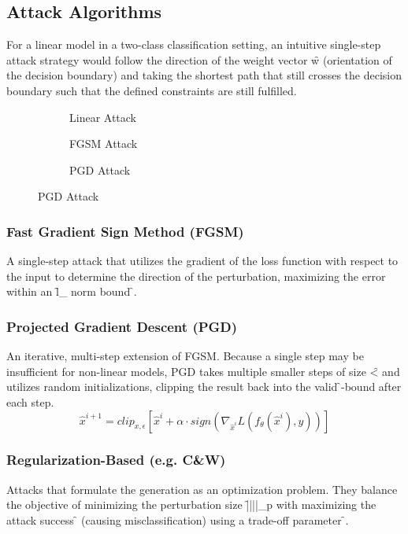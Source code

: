\subsection{Attack Algorithms}
For a linear model in a two-class classification setting, an intuitive single-step attack strategy would follow the direction of the weight vector \f{w} (orientation of the decision boundary) and taking the shortest path that still crosses the decision boundary such that the defined constraints are still fulfilled.
\begin{figure}[h!]
    \centering
    \begin{subfigure}{.3\textwidth}
        \centering{}
        \caption{Linear Attack}
    \end{subfigure}
    \begin{subfigure}{.3\textwidth}
        \centering{}
        \caption{FGSM Attack}
    \end{subfigure}
    \begin{subfigure}{.3\textwidth}
        \centering{}
        \caption{PGD Attack}
    \end{subfigure}
\end{figure}


\subsubsection{Fast Gradient Sign Method (FGSM)}
A single-step attack that utilizes the gradient of the loss function with respect to the input to determine the direction of the perturbation, maximizing the error within an \f{l_{\infty}} norm bound \f{\epsilon}.

\subsubsection{Projected Gradient Descent (PGD)}
An iterative, multi-step extension of FGSM. Because a single step may be insufficient for non-linear models, PGD takes multiple smaller steps of size \f{\alpha < \epsilon} and utilizes random initializations, clipping the result back into the valid \f{\epsilon}-bound after each step.
$$\hat{x}^{i+1} = clip_{x,\epsilon}[\hat{x}^i + \alpha \cdot sign(\nabla_{\hat{x}^i} L(f_{\theta}(\hat{x}^i), y))]$$

\subsubsection{Regularization-Based (e.g. C\&W)}
Attacks that formulate the generation as an optimization problem. They balance the objective of minimizing the perturbation size \f{||\delta||_p} with maximizing the attack success \f{\kappa} (causing misclassification) using a trade-off parameter \f{\lambda}.





